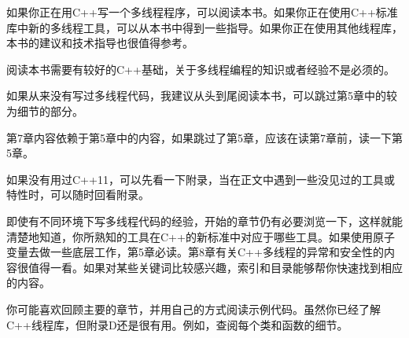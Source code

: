 如果你正在用C++写一个多线程程序，可以阅读本书。如果你正在使用C++标准库中新的多线程工具，可以从本书中得到一些指导。如果你正在使用其他线程库，本书的建议和技术指导也很值得参考。

阅读本书需要有较好的C++基础，关于多线程编程的知识或者经验不是必须的。


如果从来没有写过多线程代码，我建议从头到尾阅读本书，可以跳过第5章中的较为细节的部分。

第7章内容依赖于第5章中的内容，如果跳过了第5章，应该在读第7章前，读一下第5章。

如果没有用过C++11，可以先看一下附录，当在正文中遇到一些没见过的工具或特性时，可以随时回看附录。

即使有不同环境下写多线程代码的经验，开始的章节仍有必要浏览一下，这样就能清楚地知道，你所熟知的工具在C++的新标准中对应于哪些工具。如果使用原子变量去做一些底层工作，第5章必读。第8章有关C++多线程的异常和安全性的内容很值得一看。如果对某些关键词比较感兴趣，索引和目录能够帮你快速找到相应的内容。

你可能喜欢回顾主要的章节，并用自己的方式阅读示例代码。虽然你已经了解C++线程库，但附录D还是很有用。例如，查阅每个类和函数的细节。